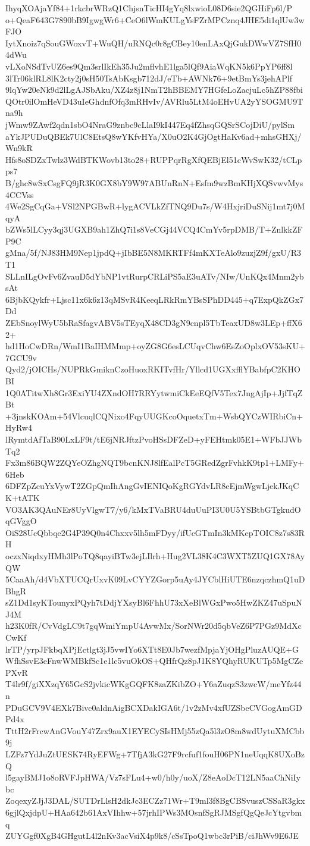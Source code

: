 IhyqXOAjaYf84+1rkcbrWRzQ1ChjsnTicHI4gYq8lxwioL08D6sie2QGHiFp6l/P
o+QeaF643G7890bB9IgwgWr6+CeO6lWmKULgYsFZrMPCznq4JHE5di1qlUw3wFJO
IytXnoiz7qSouGWoxvT+WuQH/uRNQc0r8gCBey10enLAxQjGukDWwVZ7SfH04dWu
vLXoNSdTvUZ6es9Qm3srlIkEh35Ju2mflvhE1lga5lQf9AiaWqKN5k6PpYP6ff8l
3lTr06klRL8lK2cty2j0sH50TsAbKsgb712dJ/eTb+AWNk76+9etBmYs3jehAPlf
9lqYw20eNk9d2lLgAJSbAku/XZ4z8j1NmT2hBBEMY7HGfeLoZacjuLc5hZP88fbi
QOtr0ilOmHeVD43uIeGhdnfOfq3mRHvIv/AVRlu5LtM4oEHvUA2yYSOGMU9Tna9h
jWmw9ZAwf2qdn1sbO4NraG9znbc9cLlaI9kI447Eq4fZhsqGQSrSCojDiU/pylSm
aYkJPUDuQBEk7UlC8EtsQ8wYKfvHYa/X0uO2K4GjOgtHaKv6ad+mhsGHXj/Wn9kR
Hfs8oSDZxTwlz3WdBTKWovb13to28+RUPPqrRgXfQEBjEl51cWvSwK32/tCLpps7
B/ghc8wSxCsgFQ9jR3K0GX8bY9W97ABUnRnN+Esfm9wzBmKHjXQSvwvMys4CCVss
4We2SgCqGa+VSl2NPGBwR+lygACVLkZfTNQ9Du7s/W4HxjriDuSNij1mt7j0MqyA
bZWs5lLCyy3qj3UGXB9ah1ZhQ7i1s8VeCGj44VCQ4CmYv5rpDMB/T+ZnlkkZFP9C
gMna/5f/NJ83HM9Nep1jpdQ+jIbBE5N8MKRTFf4mKXTeAlo9zuzjZ9f/gxU/R3T1
SLLnILgOvFv6ZvauD5dYbNP1vtRurpCRLiPS5aE3uATv/NIw/UnKQx4Mnm2ybsAt
6BjbKQykfr+Ljsc11x6k6z13qMSvR4KeeqLRkRmYBsSPhDD445+q7ExpQkZGx7Dd
ZEbSnoylWyU5bRaSfagvABV5sTEyqX48CD3gN9cnpl5TbTeaxUD8w3LEp+ffX62+
hd1HoCwDRn/WmI1BaIHMMmp+oyZG8G6esLCUqvChw6EsZoOplxOV53sKU+7GCU9v
Qyd2/jOICHs/NUPRkGmiknCzoHuoxRKITvfHr/Yllcd1UGXxfflYBabfpC2KHOBI
1Q0ATitwXh8Gr3ExiYU4ZXndOH7RRYytwmiCkEeEQfV5Tex7JngAjIp+JjfTqZBt
+3jnskKOAm+54VlcuqlCQNixo4FqyUUGKcoOquetxTm+WsbQYCzWIRbiCn+HyRw4
lRymtdAfTaB90LxLF9t/tE6jNRJftzPvoHSsDFZeD+yFEHtmk05E1+WFbJJWbTq2
Fx3m86BQW2ZQYeOZhgNQT9bcnKNJ8lfEalPcT5GRedZgrFvhkK9tp1+LMFy+6Heb
6DFZpZcuYxVywT2ZGpQmIhAngGvIENIQoKgRGYdvLR8eEjmWgwLjekJKqCK+tATK
VO3AK3QAuNEr8UyVlgwT7/y6/kMxTVaBRU4duUuPI3U0U5YSBtbGTgkudOqGVggO
OiS28UcQbbqe2G4P39Q0n4Chxxv5lh5mFDyy/ifUcGTmIn3kMKepTOIC8z7s83RH
oczxNiqdxyHMh3lPoTQ8qayiBTw3ejLIlrh+Hug2VL38K4C3WXT5ZUQ1GX78AyQW
5CaaAh/d4VbXTUCQrUxvK09LvCYYZGorp5uAy4JYCblHiUTE6nzqczhmQ1uDBhgR
sZ1Dd1syKTounyxPQyh7tDdjYXsyBl6FhhU73xXeBlWGxPwo5HwZKZ47uSpuNJ4M
h23K0fR/CvVdgLC9t7gqWmiYmpU4AvwMx/SorNWr20d5qbVeZ6P7PGz9MdXcCwKf
lrTP/yrpJFkbqXPjEctlgt3jJ5vwIYo6XTt8E0Jb7wezfMpjaYjOHgPluzAUQE+G
WfhSsvE3eFnwWMBkfSc1e1lc5vuOkOS+QHfrQz8pJ1K8YQhyRUKUTp5MgCZePXvR
T4lr9f/giXXzqY65GcS2jvkicWKgGQFK8zaZKibZO+Y6aZuqzS3zwcW/meYfz44n
PDuGCV9V4EXk7Bivc0aldnAigBCXDakIGA6t/1v2zMv4xfUZSbeCVGogAmGDPd4x
TttH2rFrcwAnGVouY47Zrx9auX1EYECySIsHMj55zQa5l3zO8m8wdUytuXMCbb9j
LZFz7YdJuZtUESK74RyEFWg+7TfjA3kG27F9rcfuf1fouH06PN1neUqqK8UXoBzQ
l5gayBMJ1o8oRVFJpHWA/Vz7sFLu4+w0/h0y/uoX/Z8eAoDcT12LN5aaChNiIybc
ZoqexyZJjJ3DAL/SUTDrLlsH2dkJc3ECZz71Wr+T9ml3f8BgCBSvuszCSSaR3gkx
6gjlQxjdpU+HAa642b61AxVIhhw+57jrhIPWs3MOsnfSgRJMSgfQgQeJcYtgvbmq
ZUYGgf0XgB4GHgutL4l2nKv3acVsiX4p9k8/cSsTpoQ1wbc3rPiB/ciJhWv9E6JE
